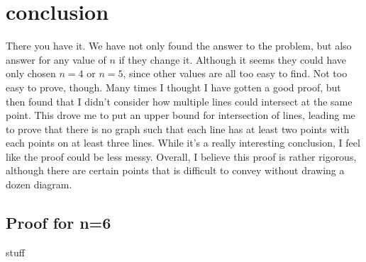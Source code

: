 \documentclass[a4paper, 12pt]{article}
\begin{document}
\section{conclusion}
There you have it. We have not only found the answer to the problem, but also answer for any value of $n$ if they change it. Although it seems they could have only chosen $n=4$ or $n=5$, since other values are all too easy to find. Not too easy to prove, though. Many times I thought I have gotten a good proof, but then found that I didn't consider how multiple lines could intersect at the same point. This drove me to put an upper bound for intersection of lines, leading me to prove that there is no graph such that each line has at least two points with each points on at least three lines. While it's a really interesting conclusion, I feel like the proof could be less messy. 
Overall, I believe this proof is rather rigorous, although there are certain points that is difficult to convey without drawing a dozen diagram.


\clearpage
\begin{appendices}

\section{Proof for n=6}
\label{appendix:proof_n6}
stuff


\end{appendices}
\end{document}
